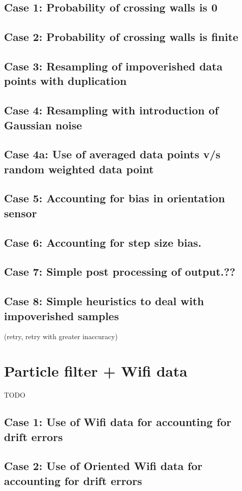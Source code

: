 \subsection{Case 1: Probability of crossing walls is 0}
\subsection{Case 2: Probability of crossing walls is finite}
\subsection{Case 3: Resampling of impoverished data points with duplication}
\subsection{Case 4: Resampling with introduction of Gaussian noise}
\subsection{Case 4a: Use of averaged data points v/s random weighted data point}
\subsection{Case 5: Accounting for bias in orientation sensor}
\subsection{Case 6: Accounting for step size bias.}
\subsection{Case 7: Simple post processing of output.??}
\subsection{Case 8: Simple heuristics to deal with impoverished samples}
(retry, retry with greater inaccuracy)

\section{Particle filter + Wifi data}
TODO

\subsection{Case 1: Use of Wifi data for accounting for drift errors}
\subsection{Case 2: Use of Oriented Wifi data for accounting for drift errors}
